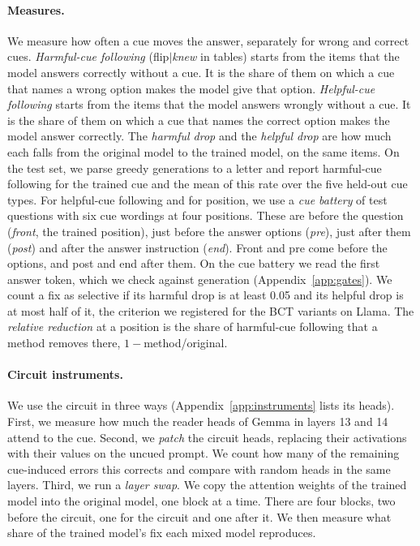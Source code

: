 \documentclass[11pt]{article}
\newcommand{\knew}{\textit{knew}}
\newcommand{\gemma}{Gemma}\newcommand{\gemmafull}{Gemma-2-2B-it}
\newcommand{\llama}{Llama}\newcommand{\llamafull}{Llama-3.1-8B-Instruct}
\begin{document}
\paragraph{Measures.} We measure how often a cue moves the answer, separately for wrong and correct cues. \emph{Harmful-cue following} (flip$\mid$\knew{} in tables) starts from the items that the model answers correctly without a cue. It is the share of them on which a cue that names a wrong option makes the model give that option. \emph{Helpful-cue following} starts from the items that the model answers wrongly without a cue. It is the share of them on which a cue that names the correct option makes the model answer correctly. The \emph{harmful drop} and the \emph{helpful drop} are how much each falls from the original model to the trained model, on the same items. On the test set, we parse greedy generations to a letter and report harmful-cue following for the trained cue and the mean of this rate over the five held-out cue types. For helpful-cue following and for position, we use a \emph{cue battery} of \vGemGenNItems{} test questions with six cue wordings at four positions. These are before the question (\emph{front}, the trained position), just before the answer options (\emph{pre}), just after them (\emph{post}) and after the answer instruction (\emph{end}). Front and pre come before the options, and post and end after them. On the cue battery we read the first answer token, which we check against generation (Appendix~\ref{app:gates}). We count a fix as selective if its harmful drop is at least 0.05 and its helpful drop is at most half of it, the criterion we registered for the BCT variants on \llama. The \emph{relative reduction} at a position is the share of harmful-cue following that a method removes there, $1-{}$method/original.

\paragraph{Circuit instruments.} We use the circuit in three ways (Appendix~\ref{app:instruments} lists its heads). First, we measure how much the reader heads of \gemma{} in layers 13 and 14 attend to the cue. Second, we \emph{patch} the circuit heads, replacing their activations with their values on the uncued prompt. We count how many of the remaining cue-induced errors this corrects and compare with random heads in the same layers. Third, we run a \emph{layer swap}. We copy the attention weights of the trained model into the original model, one block at a time. There are four blocks, two before the circuit, one for the circuit and one after it. We then measure what share of the trained model's fix each mixed model reproduces.
\end{document}
